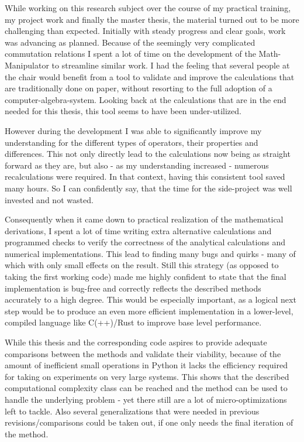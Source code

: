 While working on this research subject over the course of my practical training, my project work and finally the master thesis, the material turned out to be more challenging than expected.
Initially with steady progress and clear goals, work was advancing as planned.
Because of the seemingly very complicated commutation relations I spent a lot of time on the development of the Math-Manipulator to streamline similar work.
I had the feeling that several people at the chair would benefit from a tool to validate and improve the calculations that are traditionally done on paper, without resorting to the full adoption of a computer-algebra-system.
Looking back at the calculations that are in the end needed for this thesis, this tool seems to have been under-utilized.

However during the development I was able to significantly improve my understanding for the different types of operators, their properties and differences.
This not only directly lead to the calculations now being as straight forward as they are, but also - as my understanding increased - numerous recalculations were required.
In that context, having this consistent tool saved many hours.
So I can confidently say, that the time for the side-project was well invested and not wasted.

Consequently when it came down to practical realization of the mathematical derivations, I spent a lot of time writing extra alternative calculations and programmed checks to verify the correctness of the analytical calculations and numerical implementations.
This lead to finding many bugs and quirks - many of which with only small effects on the result. 
Still this strategy (as opposed to taking the first \glqq working\grqq{} code) made me highly confident to state that the final implementation is bug-free and correctly reflects the described methods accurately to a high degree.
This would be especially important, as a logical next step would be to produce an even more efficient implementation in a lower-level, compiled language like C(++)/Rust to improve base level performance.

While this thesis and the corresponding code aspires to provide adequate comparisons between the methods and validate their viability, because of the amount of inefficient small operations in Python it lacks the efficiency required for taking on experiments on very large systems.
This shows that the described computational complexity class can be reached and the method can be used to handle the underlying problem - yet there still are a lot of micro-optimizations left to tackle.
Also several generalizations that were needed in previous revisions/comparisons could be taken out, if one only needs the final iteration of the method.

